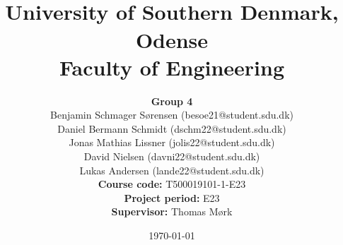 \title{\textbf{}\vspace*{0.5em} \\
    \LARGE  University of Southern Denmark, Odense \vspace*{0.5em}\\
    \LARGE Faculty of Engineering}
\date{\today\vspace*{16em}}
\maketitle
\begin{center}
    \author{\large \textbf{Group 4}\\\vspace*{3mm}
        \vspace*{3mm}
        \large Benjamin Schmager Sørensen (besoe21@student.sdu.dk)\\
        \vspace*{3mm}
        \large Daniel Bermann Schmidt (dschm22@student.sdu.dk)\\
        \vspace*{3mm}
        \large Jonas Mathias Lissner (jolis22@student.sdu.dk)\\
        \vspace*{3mm}
        \large David Nielsen (davni22@student.sdu.dk)\\
        \vspace*{3mm}
        \large  Lukas Andersen (lande22@student.sdu.dk)\\
        \vspace*{3mm}\vspace*{3em}
        \large \textbf{Course code:} T500019101-1-E23\vspace*{1em}\\
        \large \textbf{Project period:} E23\vspace*{1em}\\
        \large \textbf{Supervisor:} Thomas Mørk\vspace*{1em}\\
    }
\end{center}

\maketitle

\thispagestyle{empty}
\clearpage
{}